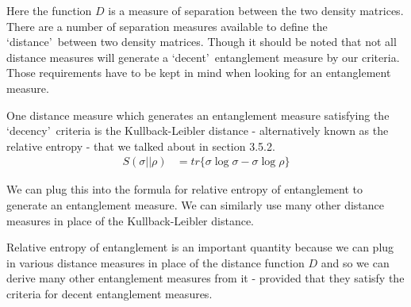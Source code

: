 \par Here the function $D$ is a measure of separation between the two density matrices. There are a number of separation measures available to define the \textquoteleft distance\textquoteright \  between two density matrices. Though it should be noted that not all distance measures will generate a \textquoteleft decent\textquoteright \  entanglement measure by our criteria. Those requirements have to be kept in mind when looking for an entanglement measure.

\par One distance measure which generates an entanglement measure satisfying the \textquoteleft decency\textquoteright \  criteria is the Kullback-Leibler distance - alternatively known as the relative entropy - that we talked about in section 3.5.2.
\begin{align*}
S(\sigma||\rho) &= tr \{ \sigma \log \sigma - \sigma \log \rho \}
\end{align*}
\par We can plug this into the formula for relative entropy of entanglement to generate an entanglement measure. We can similarly use many other distance measures in place of the Kullback-Leibler distance.
\par Relative entropy of entanglement is an important quantity because we can plug in various distance measures in place of the distance function $D$ and so we can derive many other entanglement measures from it - provided that they satisfy the criteria for decent entanglement measures. \cite{vedralteleportation}

